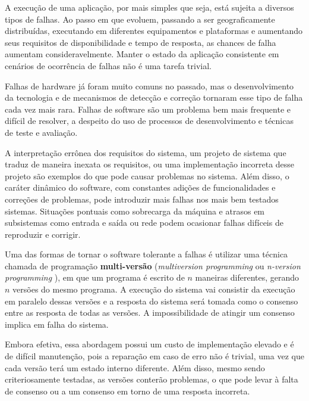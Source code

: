 \documentclass[11pt,twoside,a4paper]{book}
\begin{document}

A execução de uma aplicação, por mais simples que seja, está sujeita a diversos tipos de falhas. Ao passo em que evoluem, passando a ser geograficamente distribuídas, executando em diferentes equipamentos e plataformas e aumentando seus requisitos de disponibilidade e tempo de resposta, as chances de falha aumentam consideravelmente. Manter o estado da aplicação consistente em cenários de ocorrência de falhas não é uma tarefa trivial.

Falhas de hardware já foram muito comuns no passado, mas o desenvolvimento da tecnologia e de mecanismos de detecção e correção tornaram esse tipo de falha cada vez mais rara. Falhas de software são um problema bem mais frequente e difícil de resolver, a despeito do uso de processos de desenvolvimento e técnicas de teste e avaliação.

A interpretação errônea dos requisitos do sistema, um projeto de sistema que traduz de maneira inexata os requisitos, ou uma implementação incorreta desse projeto são exemplos do que pode causar problemas no sistema. Além disso, o caráter dinâmico do software, com constantes adições de funcionalidades e correções de problemas, pode introduzir mais falhas nos mais bem testados sistemas. Situações pontuais como sobrecarga da máquina e atrasos em subsistemas como entrada e saída ou rede podem ocasionar falhas difíceis de reproduzir e corrigir.

Uma das formas de tornar o software tolerante a falhas é utilizar uma técnica chamada de programação \textbf{multi-versão} (\emph{multiversion programming} ou \emph{n-version programming} \cite{n_version}), em que um programa é escrito de $n$ maneiras diferentes, gerando $n$ versões do mesmo programa. A execução do sistema vai consistir da execução em paralelo dessas versões e a resposta do sistema será tomada como o consenso entre as resposta de todas as versões. A impossibilidade de atingir um consenso implica em falha do sistema.

Embora efetiva, essa abordagem possui um custo de implementação elevado e é de difícil manutenção, pois a reparação em caso de erro não é trivial, uma vez que cada versão terá um estado interno diferente. Além disso, mesmo sendo criteriosamente testadas, as versões conterão problemas, o que pode levar à falta de consenso ou a um consenso em torno de uma resposta incorreta.
\end{document}
